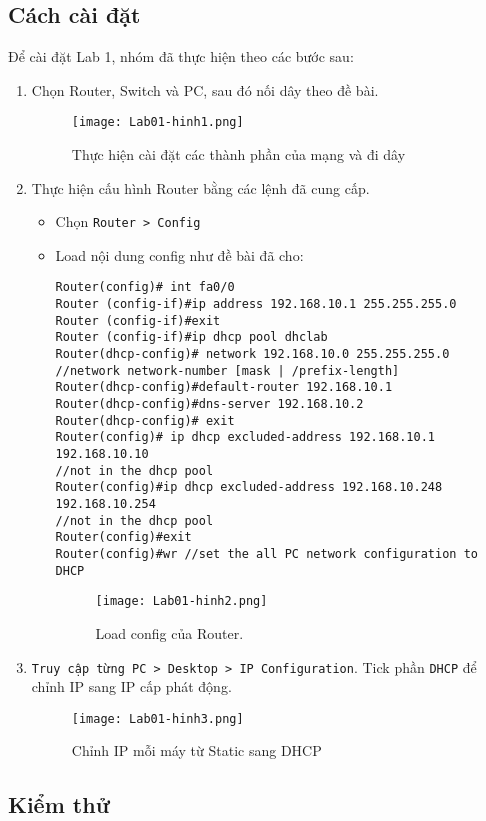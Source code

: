 \documentclass[]{article}
\begin{document}
\subsection{Cách cài đặt}
Để cài đặt Lab 1, nhóm đã thực hiện theo các bước sau:
\begin{enumerate}
\item Chọn Router, Switch và PC, sau đó nối dây theo đề bài.
\begin{figure}[H]
    \centering
    \texttt{[image: Lab01-hinh1.png]}
    \caption{Thực hiện cài đặt các thành phần của mạng và đi dây}
\end{figure}
\item Thực hiện cấu hình Router bằng các lệnh đã cung cấp.
\begin{itemize}
\item Chọn \texttt{Router > Config}
\item Load nội dung config như đề bài đã cho:
\begin{lstlisting}
Router(config)# int fa0/0
Router (config-if)#ip address 192.168.10.1 255.255.255.0
Router (config-if)#exit
Router (config-if)#ip dhcp pool dhclab
Router(dhcp-config)# network 192.168.10.0 255.255.255.0
//network network-number [mask | /prefix-length]
Router(dhcp-config)#default-router 192.168.10.1
Router(dhcp-config)#dns-server 192.168.10.2
Router(dhcp-config)# exit
Router(config)# ip dhcp excluded-address 192.168.10.1 192.168.10.10
//not in the dhcp pool
Router(config)#ip dhcp excluded-address 192.168.10.248 192.168.10.254
//not in the dhcp pool
Router(config)#exit
Router(config)#wr //set the all PC network configuration to DHCP
\end{lstlisting}
\begin{figure}[H]
    \centering
    \texttt{[image: Lab01-hinh2.png]}
    \caption{Load config của Router.}
\end{figure}
\end{itemize}
\item \texttt{Truy cập từng PC > Desktop > IP Configuration}. Tick phần \texttt{DHCP} để chỉnh IP sang IP cấp phát động.\label{checkDHCP}
\begin{figure}[H]
    \centering
    \texttt{[image: Lab01-hinh3.png]}
    \caption{Chỉnh IP mỗi máy từ Static sang DHCP}
\end{figure}
\end{enumerate}

\subsection{Kiểm thử}
\end{document}
